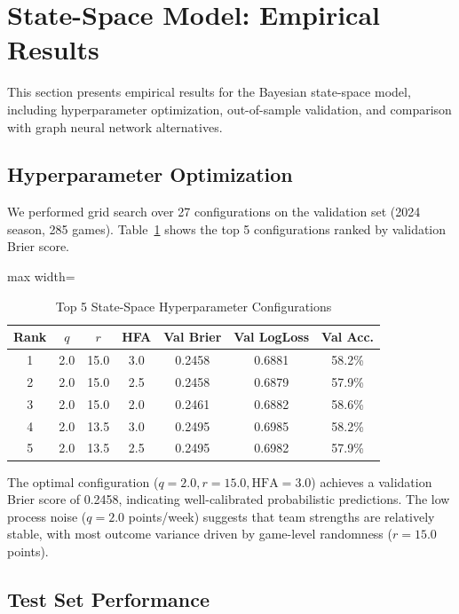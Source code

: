 \section{State-Space Model: Empirical Results}
\label{sec:state-space-results}

This section presents empirical results for the Bayesian state-space model, including hyperparameter optimization, out-of-sample validation, and comparison with graph neural network alternatives.

\subsection{Hyperparameter Optimization}

We performed grid search over 27 configurations on the validation set (2024 season, 285 games). Table~\ref{tab:state-space-hyperparameter-search} shows the top 5 configurations ranked by validation Brier score.

\begin{table}[htbp]
\centering
\caption{Top 5 State-Space Hyperparameter Configurations}
\label{tab:state-space-hyperparameter-search}
\begin{adjustbox}{max width=\textwidth}
\begin{tabular}{ccccccc}
\toprule
\textbf{Rank} & $q$ & $r$ & \textbf{HFA} & \textbf{Val Brier} & \textbf{Val LogLoss} & \textbf{Val Acc.} \\
\midrule
1 & 2.0 & 15.0 & 3.0 & 0.2458 & 0.6881 & 58.2\% \\
2 & 2.0 & 15.0 & 2.5 & 0.2458 & 0.6879 & 57.9\% \\
3 & 2.0 & 15.0 & 2.0 & 0.2461 & 0.6882 & 58.6\% \\
4 & 2.0 & 13.5 & 3.0 & 0.2495 & 0.6985 & 58.2\% \\
5 & 2.0 & 13.5 & 2.5 & 0.2495 & 0.6982 & 57.9\% \\
\bottomrule
\end{tabular}
\end{adjustbox}
\end{table}

The optimal configuration ($q=2.0, r=15.0, \text{HFA}=3.0$) achieves a validation Brier score of 0.2458, indicating well-calibrated probabilistic predictions. The low process noise ($q=2.0$ points/week) suggests that team strengths are relatively stable, with most outcome variance driven by game-level randomness ($r=15.0$ points).

\subsection{Test Set Performance}

